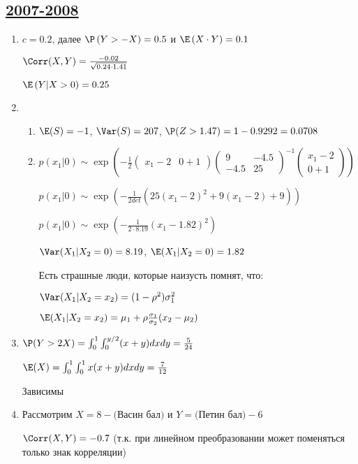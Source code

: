 \subsection[2007-2008]{\hyperref[sec:kr_01_2007_2008]{2007-2008}}
\label{sec:sol_kr_01_2007_2008}

\begin{enumerate}
\item $c = 0.2$, далее $\P\left(Y>-X\right)=0.5$  и $\E\left(X\cdot Y\right)=0.1$

$\Corr(X,Y)=\frac{-0.02}{\sqrt{0.24\cdot 1.41}}$

$\E\left(Y|X>0\right)=0.25$
\item
\begin{enumerate}
\item $\E(S)=-1$, $\Var(S)=207$, $\P(Z>1.47)=1-0.9292=0.0708$
\item $p(x_{1}|0)\sim \exp\left(-\frac{1}{2}\left(\begin{array}{cc} {x_{1}-2} & {0+1} \end{array}\right) \left(\begin{array}{cc} {9} & {-4.5} \\ {-4.5} & {25}
\end{array}\right)^{-1}\left(\begin{array}{c} {x_{1}-2} \\ {0+1}
\end{array}\right)\right)$

$p(x_{1}|0)\sim \exp\left(-\frac{1}{2det}(25(x_{1}-2)^{2}+9(x_{1}-2)+9)\right)$

$p(x_{1}|0)\sim \exp\left(-\frac{1}{2\cdot 8.19}(x_{1}-1.82)^{2}\right)$

$\Var(X_{1}|X_{2}=0)=8.19$, $\E(X_{1}|X_{2}=0)=1.82$

Есть страшные люди, которые наизусть помнят, что:

$\Var(X_{1}|X_{2}=x_{2})=(1-\rho^{2})\sigma_{1}^{2}$

$\E(X_{1}|X_{2}=x_{2})=\mu_{1} + \rho\frac{\sigma_{1}}{\sigma_{2}}(x_{2}-\mu_{2})$
\end{enumerate}
\item $\P(Y>2X)=\int_{0}^{1}\int_{0}^{y/2}(x+y)dxdy=\frac{5}{24}$

$\E(X)=\int_{0}^{1}\int_{0}^{1}x(x+y)dxdy=\frac{7}{12}$

Зависимы
\item Рассмотрим $X=8-($Васин бал$)$ и $Y=($Петин бал$)-6$

$\Corr(X,Y)=-0.7$ (т.к. при линейном преобразовании может поменяться только знак корреляции)


\end{enumerate}
